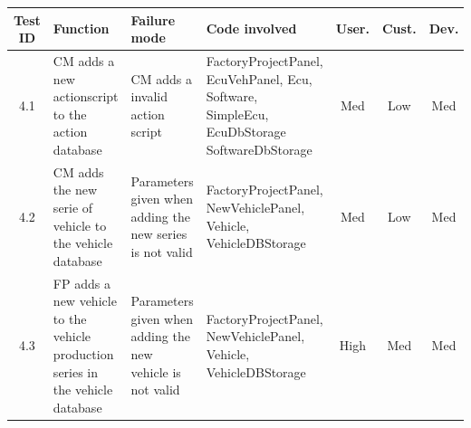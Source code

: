 \begin{landscape}
		\begin{table}[H]
			\begin{tabular}{ c | p{5cm} | p{5cm} | p{5cm} | c | c | c}
				\hline
				{\bf Test ID} & {\bf Function} & {\bf Failure mode} & {\bf Code involved} & 
				{\bf User.} & {\bf Cust.} & {\bf Dev.} \\ \hline
				4.1
				& CM adds a new actionscript to the action database
				& CM adds a invalid action script
				& FactoryProjectPanel, EcuVehPanel, Ecu, Software, SimpleEcu, EcuDbStorage
				SoftwareDbStorage
				& Med & Low & Med \\ \hline
				4.2
				& CM adds the new serie of vehicle to the vehicle database
				& Parameters given when adding the new series is not valid
				& FactoryProjectPanel, NewVehiclePanel, Vehicle, VehicleDBStorage
				& Med & Low & Med \\ \hline
				4.3
				& FP adds a new vehicle to the vehicle production series in the vehicle database
				& Parameters given when adding the new vehicle is not valid
				& FactoryProjectPanel, NewVehiclePanel, Vehicle, VehicleDBStorage
				& High & Med & Med \\ \hline

			\end{tabular}
		\end{table}


\end{landscape}